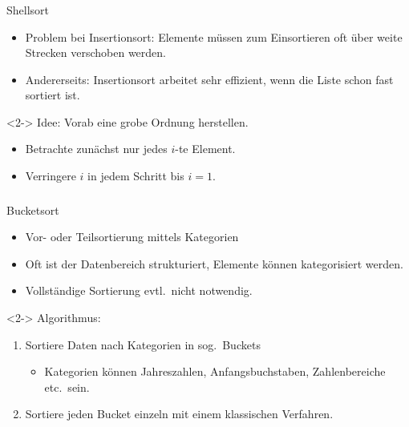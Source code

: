 \begin{frame}
\frametitle{\insertsection}
\begin{block}
{Shellsort}
\begin{itemize}
	\item Problem bei Insertionsort: Elemente müssen zum Einsortieren oft über weite Strecken verschoben werden.
	\item Andererseits: Insertionsort arbeitet sehr effizient, wenn die Liste schon fast sortiert ist.
\end{itemize}
\end{block}
\begin{block}<2->
{Idee: Vorab eine grobe Ordnung herstellen.}
\begin{itemize}
	\item Betrachte zunächst nur jedes $i$-te Element.
	\item Verringere $i$ in jedem Schritt bis $i=1$.
\end{itemize}
\end{block}
\end{frame}

\begin{frame}
\frametitle{\insertsection}
\begin{block}
{Bucketsort}
\begin{itemize}
	\item Vor- oder Teilsortierung mittels Kategorien
	\item Oft ist der Datenbereich strukturiert, Elemente können kategorisiert werden.
	\item Vollständige Sortierung evtl.\ nicht notwendig.
\end{itemize}
\end{block}
\begin{block}<2->
{Algorithmus:}
\begin{enumerate}
	\item Sortiere Daten nach Kategorien in sog.\ \alert{Buckets}
	\begin{itemize}
		\item Kategorien können Jahreszahlen, Anfangsbuchstaben, Zahlenbereiche etc.\ sein.
	\end{itemize}
	\item Sortiere jeden Bucket einzeln mit einem klassischen Verfahren.
\end{enumerate}
\end{block}
\end{frame}

\endinput

\begin{frame}
\frametitle{\insertsection}
\begin{block}
{}
\end{block}
\end{frame}